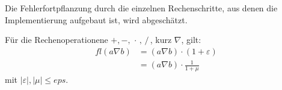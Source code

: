 
Die Fehlerfortpflanzung durch die einzelnen Rechenschritte, aus denen die Implementierung aufgebaut ist, wird abgeschätzt.

\begin{Beme}
  Für die Rechenoperationene $+,-,\, \cdot \, , \, /\,$, kurz $\nabla$, gilt:
  \begin{align}
    \nonumber
    fl(a\nabla b) &= (a\nabla b)\cdot (1+\varepsilon) \\
                  &= (a\nabla b) \cdot \frac{1}{1+\mu} \label{III.3.1}
  \end{align}
  mit $|\varepsilon|, |\mu| \leq eps$.
\end{Beme}


